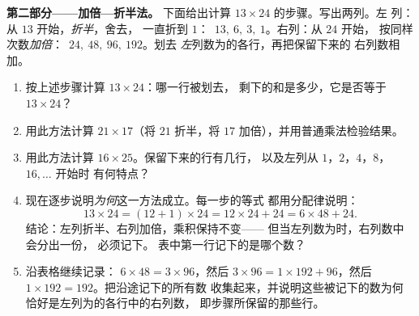 \begin{problem}
\medskip
\noindent\textbf{第二部分——加倍—折半法。}
下面给出计算 $13 \times 24$ 的步骤。写出两列。左
列：从 $13$ 开始，\emph{折半}，舍去，
一直折到 $1$：\ $13,\ 6,\ 3,\ 1$。右列：从 $24$ 开始，
按同样次数\emph{加倍}：\ $24,\ 48,\ 96,\ 192$。划去
\emph{左}列数为的各行，再把保留下来的
右列数相加。
\begin{enumerate}[resume]
  \item 按上述步骤计算 $13 \times 24$：哪一行被划去，
        剩下的和是多少，它是否等于
        $13 \times 24$？
  \item 用此方法计算 $21 \times 17$（将 $21$ 折半，将
        $17$ 加倍），并用普通乘法检验结果。
  \item 用此方法计算 $16 \times 25$。保留下来的行有几行，
        以及左列从 $1$，$2$，$4$，$8$，$16, \dots$ 开始时
        有何特点？
  \item 现在逐步说明\emph{为何}这一方法成立。每一步的等式
        都用分配律说明：
        \[
        13 \times 24 = (12 + 1) \times 24
        = 12 \times 24 + 24 = 6 \times 48 + 24 .
        \]
        结论：左列折半、右列加倍，乘积保持不变——
        但当左列数为\emph{}时，右列数中会分出一份，
        必须记下。
        表中第一行记下的是哪个数？
  \item 沿表格继续记录：
        $6 \times 48 = 3 \times 96$，然后
        $3 \times 96 = 1 \times 192 + 96$，然后
        $1 \times 192 = 192$。把沿途记下的所有数
        收集起来，并说明这些被记下的数为何
        恰好是左列为的各行中的右列数，
        即步骤所保留的那些行。
\end{enumerate}


\end{problem}
